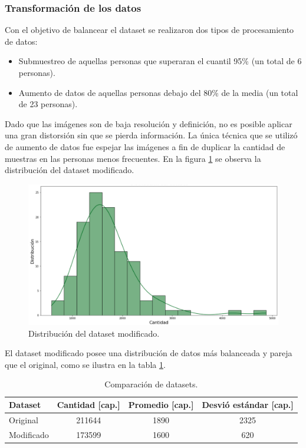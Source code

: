 \subsubsection{Transformación de los datos}

Con el objetivo de balancear el dataset se realizaron dos tipos de procesamiento de datos:
\begin{itemize}
\item Submuestreo de aquellas personas que superaran el cuantil 95\% (un total de 6 personas).
\item Aumento de datos de aquellas personas debajo del 80\% de la media (un total de 23 personas).
\end{itemize}

Dado que las imágenes son de baja resolución y definición, no es posible aplicar una gran distorsión sin que se pierda información. La única técnica que se utilizó de aumento de datos fue espejar las imágenes a fin de duplicar la cantidad de muestras en las personas menos frecuentes. En la figura \ref{fig:distribucionFinal} se observa la distribución del dataset modificado.

\newpage

\begin{figure}[ht]
	\centering
	\includegraphics[scale=.50]{./Figures/distribucionFinal.png}
	\caption{Distribución del dataset modificado.}
	\label{fig:distribucionFinal}
\end{figure}

El dataset modificado posee una distribución de datos más balanceada y pareja que el original, como se ilustra en la tabla \ref{tab:datasets}.

\begin{table}[h]
	\centering
	\caption[Dataset]{Comparación de datasets.}
	\begin{tabular}{l c c c}    
		\toprule
		\textbf{Dataset}   & \textbf{Cantidad [cap.]} & \textbf{Promedio [cap.]} & \textbf{Desvió estándar [cap.]}\\
		\midrule
		Original & 211644 & 1890   & 2325 \\		
		Modificado & 173599 & 1600  & 620 \\
		\bottomrule
		\hline
	\end{tabular}
	\label{tab:datasets}
\end{table}

